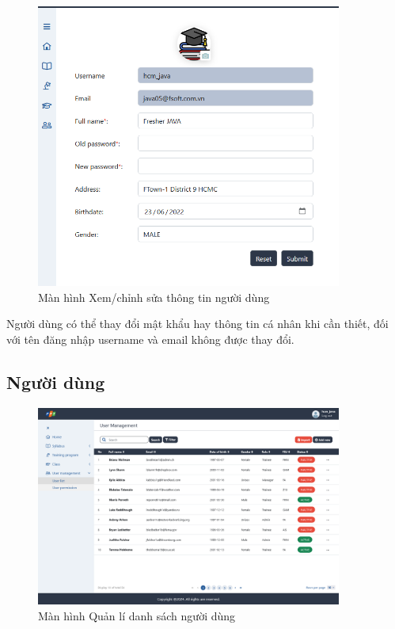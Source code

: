 \documentclass[report.tex]{subfiles}
\begin{document}
\begin{figure}[!htb]
{\centering
\includegraphics[width=380px]{../meta/ui.user-info.png}
\caption{Màn hình Xem/chỉnh sửa thông tin người dùng}
\par
}
\end{figure}
\FloatBarrier

Người dùng có thể thay đổi mật khẩu hay thông tin cá nhân khi cần thiết,
đối với tên đăng nhập username và email không được thay đổi.

\subsection{Người dùng}

\begin{figure}[!htb]
{\centering
\includegraphics[width=380px]{../meta/ui.user-list.png}
\caption{Màn hình Quản lí danh sách người dùng}
\par
}
\end{figure}
\FloatBarrier
\end{document}
